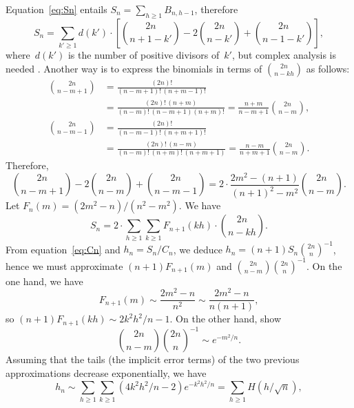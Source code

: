 Equation~\eqref{eq:Sn} entails \(S_{n} = \sum_{h \geqslant 1}
B_{n,h-1}\), therefore
\begin{equation*}
S_{n} = \sum_{k' \geqslant 1}d(k') \cdot
         \left[\binom{2n}{n+1-k'} - 2\binom{2n}{n-k'}
         + \binom{2n}{n-1-k'}\right],
\end{equation*}
where~\(d(k')\) is the number of positive divisors of~\(k'\), but
complex analysis is needed
\citep{KnuthdeBruijnRice_1972,FlajoletGourdonDumas_1995}. Another way
is to express the binomials in terms of \(\binom{2n}{n-kh}\) as
follows:
\begin{align*}
\binom{2n}{n-m+1} &= \frac{(2n)!}{(n-m+1)!\,(n+m-1)!}\\
                  &= \frac{(2n)!\,(n+m)}{(n-m)!\,(n-m+1)(n+m)!} 
                   = \frac{n+m}{n-m+1}\binom{2n}{n-m},\\
\binom{2n}{n-m-1} &= \frac{(2n)!}{(n-m-1)!\,(n+m+1)!}\\
                  &= \frac{(2n)!\,(n-m)}{(n-m)!\,(n+m)!\,(n+m+1)}
                   = \frac{n-m}{n+m+1}\binom{2n}{n-m}.
\end{align*}
Therefore,
\begin{equation*}
\binom{2n}{n-m+1} - 2\binom{2n}{n-m} + \binom{2n}{n-m-1}
= 2 \cdot \frac{2m^2-(n+1)}{(n+1)^2-m^2}\binom{2n}{n-m}.
\end{equation*}
Let \(F_n(m) = (2m^2-n)/(n^2-m^2)\). We have
\begin{equation*}
S_{n} = 2 \cdot \sum_{h \geqslant 1}\sum_{k \geqslant 1} F_{n+1}(kh)
\cdot \binom{2n}{n-kh}.
\end{equation*}
From equation~\eqref{eq:Cn} and \(h_n = S_n/C_n\), we deduce \(h_{n} =
(n+1)S_{n}{\binom{2n}{n}}^{-1}\), hence we must approximate
\((n+1)F_{n+1}(m)\) and \(\binom{2n}{n-m}\binom{2n}{n}^{-1}\). On the
one hand, we have
\begin{equation*}
F_{n+1}(m) \sim \frac{2m^2-n}{n^2} \sim \frac{2m^2-n}{n(n+1)},
\end{equation*}
so \((n+1)F_{n+1}(kh) \sim 2k^2h^2\!/n-1\). On the other hand,
\citet*[4.6, 4.8]{SedgewickFlajolet_1996} show
\begin{equation*}
\binom{2n}{n-m}{\binom{2n}{n}}^{-1} \sim e^{-m^2\!/n}.
\end{equation*}
Assuming that the tails (the implicit error terms) of the two previous
approximations decrease exponentially, we have
\begin{equation*}
h_{n} \sim \sum_{h \geqslant 1}\sum_{k \geqslant 1}
(4k^2h^2\!/n - 2)e^{-k^2h^2\!/n}
= \sum_{h \geqslant 1}H(h/\!\sqrt{n}), 
\end{equation*}
